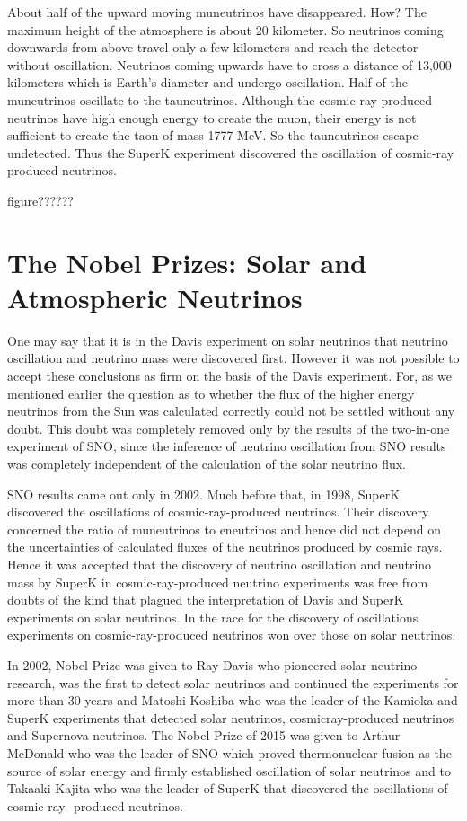 About half of the upward moving muneutrinos have disappeared. How?
The maximum height of the atmosphere is about 20 kilometer. So neutrinos coming downwards from above travel only a few kilometers and reach
the detector without oscillation. Neutrinos coming upwards have to cross a
distance of 13,000 kilometers which is Earth’s diameter and undergo oscillation. Half of the muneutrinos oscillate to the tauneutrinos. Although the
cosmic-ray produced neutrinos have high enough energy to create the muon,
their energy is not sufficient to create the taon of mass 1777 MeV. So the
tauneutrinos escape undetected. Thus the SuperK experiment discovered the
oscillation of cosmic-ray produced neutrinos.

figure??????

\section{The Nobel Prizes: Solar and Atmospheric Neutrinos}

One may say that it is in the Davis experiment on solar neutrinos that
neutrino oscillation and neutrino mass were discovered first. However it was
not possible to accept these conclusions as firm on the basis of the Davis
experiment. For, as we mentioned earlier the question as to whether the
flux of the higher energy neutrinos from the Sun was calculated correctly
could not be settled without any doubt. This doubt was completely removed only by the results of the two-in-one experiment of SNO, since the inference
of neutrino oscillation from SNO results was completely independent of the
calculation of the solar neutrino flux.

SNO results came out only in 2002. Much before that, in 1998, SuperK
discovered the oscillations of cosmic-ray-produced neutrinos. Their discovery
concerned the ratio of muneutrinos to eneutrinos and hence did not depend
on the uncertainties of calculated fluxes of the neutrinos produced by cosmic
rays. Hence it was accepted that the discovery of neutrino oscillation and
neutrino mass by SuperK in cosmic-ray-produced neutrino experiments was
free from doubts of the kind that plagued the interpretation of Davis and
SuperK experiments on solar neutrinos. In the race for the discovery of
oscillations experiments on cosmic-ray-produced neutrinos won over those
on solar neutrinos.

In 2002, Nobel Prize was given to Ray Davis who pioneered solar neutrino
research, was the first to detect solar neutrinos and continued the experiments
for more than 30 years and Matoshi Koshiba who was the leader of the
Kamioka and SuperK experiments that detected solar neutrinos, cosmicray-produced neutrinos and Supernova neutrinos. The Nobel Prize of 2015
was given to Arthur McDonald who was the leader of SNO which proved
thermonuclear fusion as the source of solar energy and firmly established
oscillation of solar neutrinos and to Takaaki Kajita who was the leader of
SuperK that discovered the oscillations of cosmic-ray- produced neutrinos.

